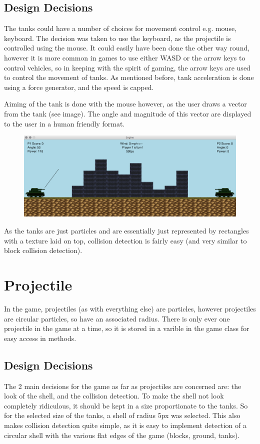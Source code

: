 \documentclass[12pt]{article}
\begin{document}
\subsection{Design Decisions}
The tanks could have a number of choices for movement control e.g. mouse, keyboard. The decision was taken to use the keyboard, as the projectile is controlled using the mouse. It could easily have been done the other way round, however it is more common in games to use either WASD or the arrow keys to control vehicles, so in keeping with the spirit of gaming, the arrow keys are used to control the movement of tanks. As mentioned before, tank acceleration is done using a force generator, and the speed is capped.
\par 
Aiming of the tank is done with the mouse however, as the user draws a vector from the tank (see image). The angle and magnitude of this vector are displayed to the user in a human friendly format.
\begin{figure}[H]
\centerline{\includegraphics[width=17cm]{vector}}
\end{figure}
\par
As the tanks are just particles and are essentially just represented by rectangles with a texture laid on top, collision detection is fairly easy (and very similar to block collision detection).
\section{Projectile}
In the game, projectiles (as with everything else) are particles, however projectiles are circular particles, so have an associated radius. There is only ever one projectile in the game at a time, so it is stored in a varible in the game class for easy access in methods.
\subsection{Design Decisions}
The 2 main decisions for the game as far as projectiles are concerned are: the look of the shell, and the collision detection. To make the shell not look completely ridiculous, it should be kept in a size proportionate to the tanks. So for the selected size of the tanks, a shell of radius 5px was selected. This also makes collision detection quite simple, as it is easy to implement detection of a circular shell with the various flat edges of the game (blocks, ground, tanks).
\end{document}
